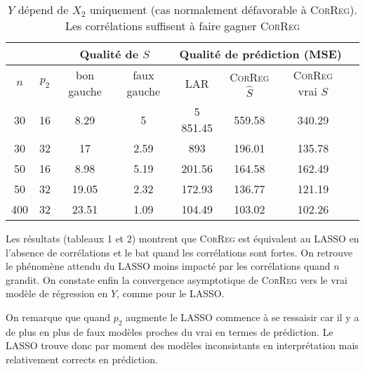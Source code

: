 \documentclass[12pt]{article}
\begin{document}
\begin{table}
\begin{tabular}{|c|c|c|c|c|c|c|c|}
\cline{3-7}
 \multicolumn{2}{c|}{}  & \multicolumn{2}{c|}{Qualité de $S$} & \multicolumn{3}{c|}{Qualité de prédiction (MSE)} \\
\hline 
$n$ & $p_2$ & bon gauche & faux gauche    & LAR  &    \textsc{CorReg} $\hat S$ & \textsc{CorReg} vrai $S$\\ 
\hline 
30 & 16 & 8.29 & 5 & 5 851.45 & 559.58 & 340.29\\ 
\hline 
30 & 32 & 17 & 2.59 & 893 & 196.01 & 135.78 \\ 
\hline 
\hline 
50 & 16 &  8.98 & 5.19 & 201.56 & 164.58 & 162.49\\ 
\hline 
50 & 32 & 19.05 & 2.32 & 172.93 & 136.77 & 121.19\\ 
\hline \hline
400 & 32 & 23.51 & 1.09 & 104.49 & 103.02 & 102.26 \\ 
\hline 
\end{tabular} 
\caption{$Y$  dépend  de $X_2$ uniquement (cas normalement défavorable à \textsc{CorReg}). Les corrélations suffisent à faire gagner \textsc{CorReg}} \label{tableMSEsimgauche}
\end{table}


Les résultats (tableaux 1 et 2) montrent que \textsc{CorReg} est équivalent au LASSO en l'absence de corrélations et le bat quand les corrélations sont fortes. On retrouve le phénomène attendu du LASSO moins impacté par les corrélations quand $n$ grandit. On constate enfin la convergence asymptotique de \textsc{CorReg} vers le vrai modèle de régression en $Y$, comme pour le LASSO.

On remarque que quand $p_2$ augmente le LASSO commence à se ressaisir car il y a de plus en plus de faux modèles proches du vrai en termes de prédiction. Le LASSO trouve donc par moment des modèles inconsistants en interprétation mais relativement corrects en prédiction. %
\end{document}
